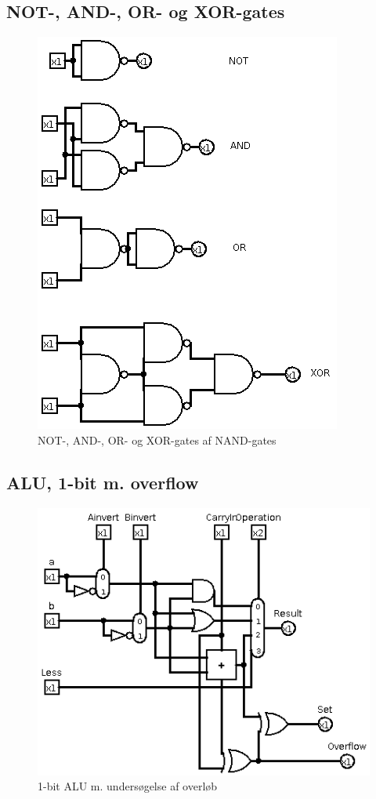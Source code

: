 \documentclass[10pt,a4paper,danish]{article}
\begin{document}
\subsection{NOT-, AND-, OR- og XOR-gates}
\begin{figure}[htb]
\begin{center}
\leavevmode
\includegraphics[scale=0.70]{circ1.png}
\end{center}
\caption{NOT-, AND-, OR- og XOR-gates af NAND-gates}
\label{fig:circ1} 
\end{figure}

\subsection{ALU, 1-bit m. overflow}
\begin{figure}[htb]
\begin{center}
\leavevmode
\includegraphics[scale=0.70]{alu-1bit-overflow.png}
\end{center}
\caption{1-bit ALU m. undersøgelse af overløb}
\label{fig:alu-1bit}
\end{figure}
\end{document}
